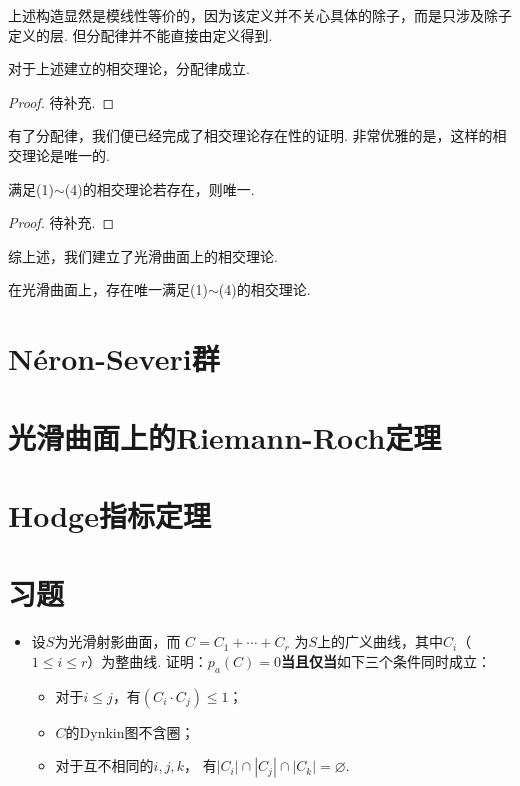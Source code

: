 上述构造显然是模线性等价的，因为该定义并不关心具体的除子，而是只涉及除子定义的层.
但分配律并不能直接由定义得到.
\begin{proposition}
    对于上述建立的相交理论，分配律成立.
\end{proposition}
\begin{proof}
    待补充.
\end{proof}

有了分配律，我们便已经完成了相交理论存在性的证明. 
非常优雅的是，这样的相交理论是唯一的.
\begin{proposition}
    满足(1)$\sim$(4)的相交理论若存在，则唯一.
\end{proposition}
\begin{proof}
    待补充.
\end{proof}

综上述，我们建立了光滑曲面上的相交理论.
\begin{theorem}
    在光滑曲面上，存在唯一满足(1)$\sim$(4)的相交理论.
\end{theorem}

\section{Néron-Severi群}

\section{光滑曲面上的Riemann-Roch定理}

\section{Hodge指标定理}

\section{习题}
\begin{itemize}
    \item[2.1] 设$S$为光滑射影曲面，而
    $C = C_{1} + \cdots + C_{r}$
    为$S$上的广义曲线，其中$C_{i}$（$1 \leq i \leq r$）为整曲线.
    证明：$p_{a}(C) = 0$\textbf{当且仅当}如下三个条件同时成立：
    \begin{itemize}
        \item[(1)] 对于$i \leq j$，有$(C_{i} \cdot C_{j}) \leq 1$；
        \item[(2)] $C$的Dynkin图不含圈；
        \item[(3)] 对于互不相同的$i,j,k$，
            有$|C_{i}| \cap |C_{j}| \cap |C_{k}| = \varnothing$.
    \end{itemize}
    \begin{proofc}[解答]

    \end{proofc}
\end{itemize}